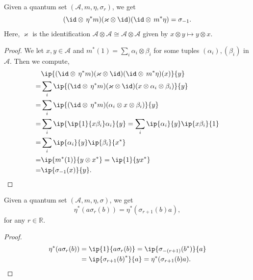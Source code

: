  \begin{proposition}\label{modAut_neg_one_eq_right_twist}
  \leanok
  Given a quantum set $(\mathcal{A},m,\eta,\sigma_r)$, we get
  \[(\id\otimes\,\eta^*m)(\varkappa\otimes\id)(\id\otimes\,m^*\eta)=\sigma_{-1}.\]
  Here, $\varkappa$ is the identification $\mathcal{A}\otimes\mathcal{A}\cong\mathcal{A}\otimes\mathcal{A}$ given by $x\otimes y\mapsto y\otimes x$.
 \end{proposition}
 \begin{proof}\leanok
  We let $x,y\in\mathcal{A}$ and $m^*(1)=\sum_i\alpha_i\otimes\beta_i$ for some tuples $(\alpha_i),(\beta_i)$ in $\mathcal{A}$. Then we compute,
  \begin{align*}
   & \ip{(\id\otimes\,\eta^*m)(\varkappa\otimes\id)(\id\otimes\,m^*\eta)(x)}{y}\\
   =& \sum_i\ip{(\id\otimes\,\eta^*m)(\varkappa\otimes\id)(x\otimes\alpha_i\otimes\beta_i)}{y}\\
   =& \sum_i\ip{(\id\otimes\,\eta^*m)(\alpha_i\otimes x\otimes\beta_i)}{y}\\
   =& \sum_i\ip{\ip{1}{x\beta_i}\alpha_i}{y} = \sum_i\ip{\alpha_i}{y}\ip{x\beta_i}{1}\\
   =& \sum_i\ip{\alpha_i}{y}\ip{\beta_i}{x^*}\\
   =& \ip{m^*(1)}{y\otimes x^*}=\ip{1}{yx^*}\\
   =& \ip{\sigma_{-1}(x)}{y}.
  \end{align*}
 \end{proof}

 \begin{lemma}\label{counit_mul_modAut_symm'}
  \leanok
  Given a quantum set $(\mathcal{A},m,\eta,\sigma)$, we get
  \[\eta^*(a\sigma_r(b)) = \eta^*(\sigma_{r + 1}(b)a),\]
  for any $r\in\mathbb{R}$.
 \end{lemma}
 \begin{proof}\leanok
  \begin{align*}
   \eta^*(a\sigma_r(b)) &= \ip{1}{a\sigma_r(b)} = \ip{\sigma_{-(r+1)}(b^*)}{a}\\
   &= \ip{{\sigma_{r+1}(b)}^*}{a}=\eta^*(\sigma_{r+1}(b)a).
  \end{align*}
 \end{proof}

